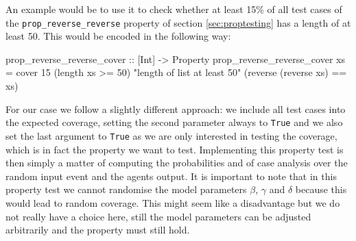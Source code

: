 An example would be to use it to check whether at least 15\% of all test cases of the \texttt{prop\_reverse\_reverse} property of section \ref{sec:proptesting} has a length of at least 50. This would be encoded in the following way:

\begin{HaskellCode}
prop_reverse_reverse_cover :: [Int] -> Property
prop_reverse_reverse_cover xs  =  
  cover 15 (length xs >= 50) "length of list at least 50" (reverse (reverse xs) == xs)
\end{HaskellCode}

%

For our case we follow a slightly different approach: we include all test cases into the expected coverage, setting the second parameter always to \texttt{True} and we also set the last argument to \texttt{True} as we are only interested in testing the coverage, which is in fact the property we want to test. Implementing this property test is then simply a matter of computing the probabilities and of case analysis over the random input event and the agents output. It is important to note that in this property test we cannot randomise the model parameters $\beta$, $\gamma$ and $\delta$ because this would lead to random coverage. This might seem like a disadvantage but we do not really have a choice here, still the model parameters can be adjusted arbitrarily and the property must still hold.

